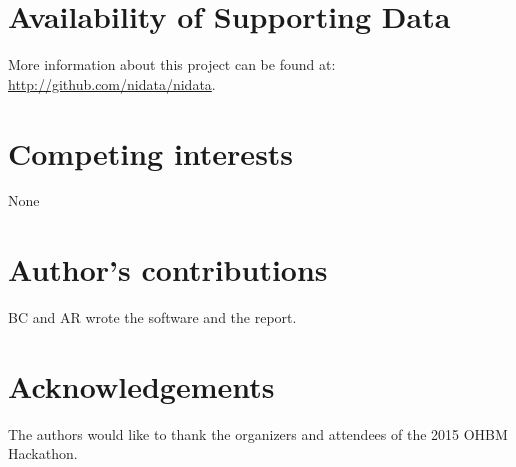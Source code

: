 \documentclass[twocolumn]{bmcart}%
\begin{document}
\begin{backmatter}

\section*{Availability of Supporting Data}
More information about this project can be found at: \url{http://github.com/nidata/nidata}.

\section*{Competing interests}
None

\section*{Author's contributions}
BC and AR wrote the software and the report.

\section*{Acknowledgements}
The authors would like to thank the organizers and attendees of the 2015
OHBM Hackathon.





\end{backmatter}
\end{document}
